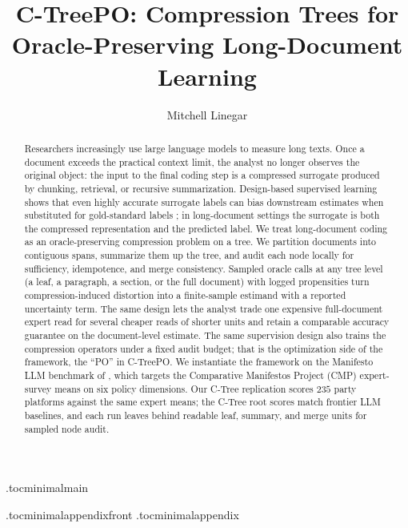 \documentclass[11pt]{article}
\title{C-TreePO: Compression Trees for Oracle-Preserving Long-Document Learning}
\author{Mitchell Linegar}
\date{}
\begin{document}
\maketitle

\begin{abstract}
Researchers increasingly use large language models to measure long
texts. Once a document exceeds the practical context limit, the
analyst no longer observes the original object: the input to the
final coding step is a compressed surrogate produced by chunking,
retrieval, or recursive summarization. Design-based supervised
learning shows that even highly accurate surrogate labels can bias
downstream estimates when substituted for gold-standard labels
\citep{EgamiEtAl2024}; in long-document settings the surrogate is
both the compressed representation and the predicted label. We treat
long-document coding as an oracle-preserving compression problem on
a tree. We partition documents into contiguous spans, summarize them
up the tree, and audit each node locally for sufficiency,
idempotence, and merge consistency. Sampled oracle calls at any tree
level (a leaf, a paragraph, a section, or the full document) with
logged propensities turn compression-induced distortion into a
finite-sample estimand with a reported uncertainty term. The same
design lets the analyst trade one expensive full-document expert
read for several cheaper reads of shorter units and retain a
comparable accuracy guarantee on the document-level estimate. The
same supervision design also trains the compression operators under a
fixed audit budget; that is the optimization side of the framework,
the ``PO'' in C-TreePO. We instantiate the framework on the
Manifesto LLM benchmark of \citet{BenoitEtAl2025}, which targets the
Comparative Manifestos Project (CMP) expert-survey means on six
policy dimensions. Our C-Tree replication scores \(235\) party
platforms against the same expert means; the C-Tree root scores
match frontier LLM baselines, and each run leaves behind readable
leaf, summary, and merge units for sampled node audit.
\end{abstract}

\tableofcontents
\clearpage

\etocdepthtag.toc{minimalmain}






\clearpage



\appendix
\etocdepthtag.toc{minimalappendixfront}
\appendixcontents
\etocdepthtag.toc{minimalappendix}











\clearpage


\end{document}
